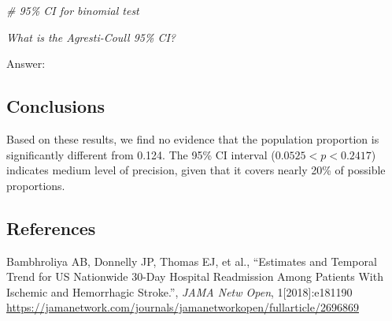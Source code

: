\documentclass[
]{article}
\newenvironment{Shaded}{\begin{snugshade}}{\end{snugshade}}
\newcommand{\CommentTok}[1]{\textcolor[rgb]{0.56,0.35,0.01}{\textit{#1}}}
\begin{document}
\begin{Shaded}
\begin{Highlighting}[]
\CommentTok{\# 95\% CI for binomial test}
\end{Highlighting}
\end{Shaded}

\emph{What is the Agresti-Coull 95\% CI?}

Answer:

\hypertarget{conclusions}{%
\subsection{Conclusions}\label{conclusions}}

Based on these results, we find no evidence that the population
proportion is significantly different from 0.124. The 95\% CI interval
(\(0.0525 < p < 0.2417\)) indicates medium level of precision, given
that it covers nearly 20\% of possible proportions.

\hypertarget{references}{%
\subsection{References}\label{references}}

Bambhroliya AB, Donnelly JP, Thomas EJ, et al., ``Estimates and Temporal
Trend for US Nationwide 30-Day Hospital Readmission Among Patients With
Ischemic and Hemorrhagic Stroke.'', \emph{JAMA Netw Open},
1{[}2018{]}:e181190
\url{https://jamanetwork.com/journals/jamanetworkopen/fullarticle/2696869}
\end{document}
